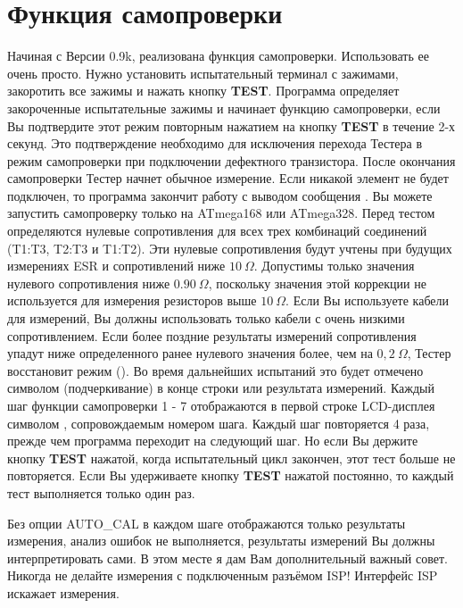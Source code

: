 
\section{Функция самопроверки}
\label{sec:selftest}
Начиная с Версии 0.9k,  реализована функция самопроверки. Использовать ее очень просто. Нужно установить 
испытательный терминал с зажимами, закоротить все зажимы и нажать кнопку \textbf{ TEST}. Программа определяет закороченные 
испытательные зажимы и начинает функцию самопроверки, если Вы подтвердите этот режим повторным нажатием на кнопку 
\textbf{ TEST} в течение 2-х секунд. Это подтверждение необходимо для исключения перехода Тестера в режим самопроверки при 
подключении дефектного транзистора. После окончания самопроверки Тестер начнет обычное измерение. Если никакой 
элемент не будет подключен, то программа закончит работу с выводом сообщения . Вы 
можете запустить самопроверку только на ATmega168 или ATmega328. Перед тестом определяются нулевые сопротивления 
для всех трех комбинаций соединений (T1:T3, T2:T3 и T1:T2). Эти нулевые сопротивления будут учтены при будущих 
измерениях ESR и сопротивлений ниже \(10~\Omega\).
Допустимы только значения нулевого сопротивления ниже \(0.90~\Omega\), поскольку значения этой коррекции
не используется для измерения резисторов выше \(10~\Omega\).
Если Вы используете кабели для измерений, Вы должны использовать только кабели с очень низкими сопротивлением.
Если более поздние результаты измерений сопротивления упадут ниже определенного ранее нулевого значения более, 
чем на \(0,2~\Omega\),
Тестер восстановит режим  (). Во время дальнейших испытаний это будет отмечено 
символом \inquotes{{\_}} (подчеркивание) в конце строки или результата измерений. Каждый шаг функции самопроверки 1 - 7 отображаются в первой 
строке LCD-дисплея символом , сопровождаемым номером шага. Каждый шаг повторяется 4 раза, прежде чем программа 
переходит на следующий шаг. Но если Вы держите кнопку \textbf{ TEST} нажатой, когда испытательный цикл закончен, этот тест 
больше не повторяется. Если Вы удерживаете кнопку \textbf{ TEST} нажатой  постоянно, то каждый тест выполняется только 
один раз. 

Без опции AUTO\_CAL в каждом шаге отображаются только результаты измерения, анализ ошибок не выполняется, результаты 
измерений Вы должны интерпретировать сами. В этом месте я дам Вам дополнительный важный совет. Никогда не делайте 
измерения с подключенным разъёмом ISP! Интерфейс ISP искажает измерения.
 
